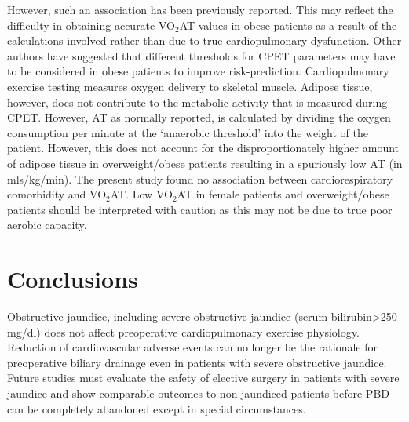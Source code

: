However, such an association has been previously reported.\parencite{horwich_relationship_2009}  This may reflect the difficulty in obtaining accurate VO$_2$AT values in obese patients as a result of the calculations involved rather than due to true cardiopulmonary dysfunction. Other authors have suggested that different thresholds for CPET parameters may have to be considered in obese patients to improve risk-prediction.\parencite{donnelly_criteria_1990,hulens_exercise_2001} Cardiopulmonary exercise testing measures oxygen delivery to skeletal muscle. Adipose tissue, however, does not contribute to the metabolic activity that is measured during CPET. However, AT as normally reported, is calculated by dividing the oxygen consumption per minute at the ‘anaerobic threshold' into the weight of the patient. However, this does not account for the disproportionately higher amount of adipose tissue in overweight/obese patients resulting in a spuriously low AT (in mls/kg/min). The present study found no association between cardiorespiratory comorbidity and VO$_2$AT. Low VO$_2$AT in female patients and overweight/obese patients should be interpreted with caution as this may not be due to true poor aerobic capacity.

\section{Conclusions}
Obstructive jaundice, including severe obstructive jaundice (serum bilirubin>250 mg/dl) does not affect preoperative cardiopulmonary exercise physiology. Reduction of cardiovascular adverse events can no longer be the rationale for preoperative biliary drainage even in patients with severe obstructive jaundice. Future studies must evaluate the safety of elective surgery in patients with severe jaundice and show comparable outcomes to non-jaundiced patients before PBD can be completely abandoned except in special circumstances.